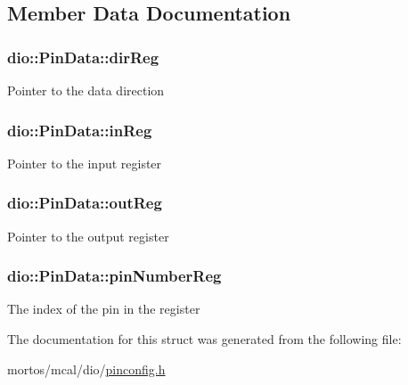 \subsection{Member Data Documentation}
\hypertarget{structdio_1_1PinData_a6e1d66e7340bdbb5cdf58cd6ae1509a0}{
\subsubsection[{dir\+Reg}]{ dio\+::\+Pin\+Data\+::dir\+Reg}}\label{structdio_1_1PinData_a6e1d66e7340bdbb5cdf58cd6ae1509a0}
Pointer to the data direction \hypertarget{structdio_1_1PinData_ae48e40979dfcc1617f72b20e3c4d0b63}{
\subsubsection[{in\+Reg}]{ dio\+::\+Pin\+Data\+::in\+Reg}}\label{structdio_1_1PinData_ae48e40979dfcc1617f72b20e3c4d0b63}
Pointer to the input register \hypertarget{structdio_1_1PinData_a6c9ea45b924aa81bf61a9653f76d0156}{
\subsubsection[{out\+Reg}]{ dio\+::\+Pin\+Data\+::out\+Reg}}\label{structdio_1_1PinData_a6c9ea45b924aa81bf61a9653f76d0156}
Pointer to the output register \hypertarget{structdio_1_1PinData_ae07b5d5d44887270452bc0901268b3d1}{
\subsubsection[{pin\+Number\+Reg}]{ dio\+::\+Pin\+Data\+::pin\+Number\+Reg}}\label{structdio_1_1PinData_ae07b5d5d44887270452bc0901268b3d1}
The index of the pin in the register 

The documentation for this struct was generated from the following file\+:\begin{DoxyCompactItemize}
\item 
mortos/mcal/dio/\hyperlink{pinconfig_8h}{pinconfig.\+h}\end{DoxyCompactItemize}
